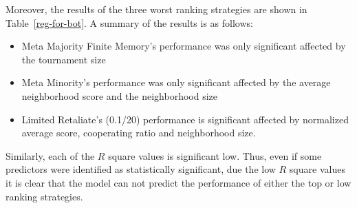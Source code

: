 Moreover, the results of the three worst ranking strategies are shown in Table~\ref{reg-for-bot}.
A summary of the results is as follows:
\begin{itemize}
	\item Meta Majority Finite Memory's performance was only significant affected by the tournament size
	\item Meta Minority's performance was only significant affected by the average neighborhood score
	      and the neighborhood size
	\item Limited Retaliate's (0.1/20) performance is significant affected by normalized average score,
	      cooperating ratio and  neighborhood size.
\end{itemize}

Similarly, each of the \(R\) square values is significant low. Thus, even if some
predictors were identified as statistically significant, due the low \(R\) square values
it is clear that the model can not predict the performance of either the top or low ranking strategies.

